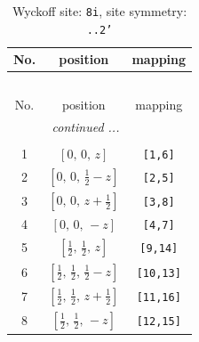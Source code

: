 \documentclass[fleqn,8pt]{jsarticle}
\begin{document}
\begin{longtable}{ccc}
\caption{Wyckoff site: {\tt 8i}, site symmetry: {\tt ..2'}}
 \\
 \hline \hline
No. & position & mapping \\ \hline \endfirsthead

\multicolumn{2}{l}{\tablename\ \thetable{}} \\
 \hline \hline
No. & position & mapping \\ \hline \endhead

 \hline \hline
\multicolumn{2}{r}{\footnotesize\it continued ...} \\ \endfoot

 \hline \hline
\multicolumn{2}{r}{} \\ \endlastfoot

1 & $\left[ 0,\, 0,\, z \right]$ & {\tt [1,6]} \\ \hline
2 & $\left[ 0,\, 0,\, \frac{1}{2} - z \right]$ & {\tt [2,5]} \\ \hline
3 & $\left[ 0,\, 0,\, z + \frac{1}{2} \right]$ & {\tt [3,8]} \\ \hline
4 & $\left[ 0,\, 0,\, - z \right]$ & {\tt [4,7]} \\ \hline
5 & $\left[ \frac{1}{2},\, \frac{1}{2},\, z \right]$ & {\tt [9,14]} \\ \hline
6 & $\left[ \frac{1}{2},\, \frac{1}{2},\, \frac{1}{2} - z \right]$ & {\tt [10,13]} \\ \hline
7 & $\left[ \frac{1}{2},\, \frac{1}{2},\, z + \frac{1}{2} \right]$ & {\tt [11,16]} \\ \hline
8 & $\left[ \frac{1}{2},\, \frac{1}{2},\, - z \right]$ & {\tt [12,15]} \\
\end{longtable}
\renewcommand{\arraystretch}{1.2}
\end{document}
